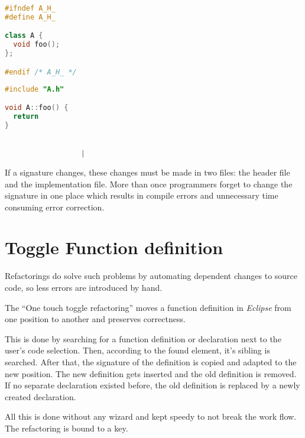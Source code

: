 \vspace{0.5cm}
\begin{minipage}{.468\textwidth}
\lstset{xrightmargin=0.55cm}
\begin{lstlisting}[caption={Header file with a\newline declaration},
label={twofile1}, language=C++]
#ifndef A_H_
#define A_H_

class A {
  void foo();
};

#endif /* A_H_ */
\end{lstlisting}
\end{minipage}%
\begin{minipage}{.492\textwidth}
\lstset{xleftmargin=0.55cm}
\begin{lstlisting}[caption={Source file containing definition},
label={twofile2}, language=C++ ]
#include "A.h"

void A::foo() {
  return
}


	              |
\end{lstlisting}
\end{minipage}

If a signature changes, these changes must be made in two files: the header file
and the implementation file. More than once programmers forget to change the
signature in one place which results in compile errors and unnecessary time
consuming error correction.

\section*{Toggle Function definition}

Refactorings do solve such problems by automating dependent changes to source
code, so
less errors are introduced by hand.

The ``One touch toggle refactoring'' moves a function definition in
\textit{Eclipse} from one position to another and preserves correctness.

This is done by searching for a function definition or declaration next to the
user's code selection. Then, according to the found
element, it's sibling is searched. After that, the signature of the definition is
copied and adapted to the new position. The new definition gets inserted and
the old definition is removed.
If no separate declaration existed before, the old definition is replaced by a 
newly created declaration.

All this is done without any wizard and kept speedy to not break the work flow.
The refactoring is bound to a key.

